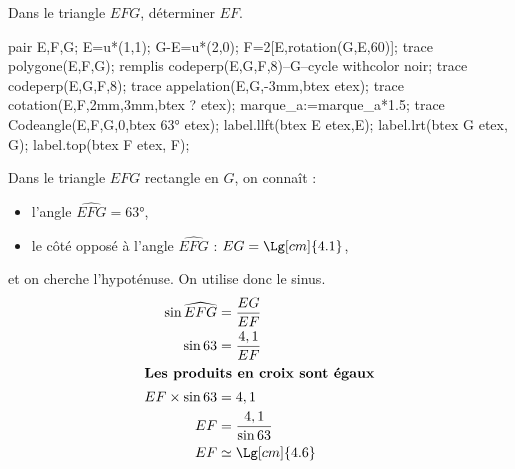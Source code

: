 \begin{methode}
    \exercice
    Dans le triangle $EFG$, déterminer $EF$.\\
    \begin{Geometrie}[CoinHD={(4u,5u)}]        
        pair E,F,G;
        E=u*(1,1);
        G-E=u*(2,0);
        F=2[E,rotation(G,E,60)];
        trace polygone(E,F,G);
        remplis codeperp(E,G,F,8)--G--cycle withcolor noir;
        trace codeperp(E,G,F,8);
        trace appelation(E,G,-3mm,btex  etex);        
        trace cotation(E,F,2mm,3mm,btex ? etex);
        marque_a:=marque_a*1.5;
        trace Codeangle(E,F,G,0,btex \ang{63} etex);
        label.llft(btex E etex,E);
        label.lrt(btex G etex, G);
        label.top(btex F etex, F);
    \end{Geometrie}
    \correction
    Dans le triangle $EFG$ rectangle en $G$, on connaît :
    \begin{itemize}        
        \item l'angle $\widehat{EFG}=\ang{63}$,        
        \item le côté opposé à l'angle $\widehat{EFG}$ : $EG=\Lg[cm]{4.1}$,
    \end{itemize}
    et on cherche l'hypoténuse. On utilise donc le sinus.
    \begin{align*}
        \sin\widehat{EFG}&=\frac{EG}{EF}\\
        \sin63&=\frac{4,1}{EF}\\
        \intertext{\centering\bf Les produits en croix sont égaux}
        EF\times\sin63&=4,1\\
        EF&=\frac{4,1}{\sin63}\\
        EF&\simeq\Lg[cm]{4.6}
    \end{align*}
\end{methode}

